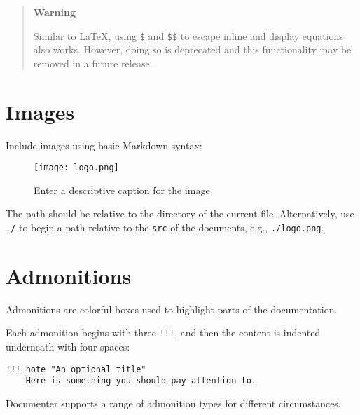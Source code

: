 \begin{quote}
\textbf{Warning}

Similar to LaTeX, using \texttt{\$} and \texttt{\$\$} to escape inline and display equations also works. However, doing so is deprecated and this functionality may be removed in a future release.

\end{quote}


\section{Images}



\label{5224713065671704740}{}


Include images using basic Markdown syntax:



\begin{figure}
\centering
\texttt{[image: logo.png]}
\caption{Enter a descriptive caption for the image}
\end{figure}




The path should be relative to the directory of the current file. Alternatively, use \texttt{./} to begin a path relative to the \texttt{src} of the documents, e.g., \texttt{./logo.png}.



\section{Admonitions}



\label{1916796393499649241}{}


Admonitions are colorful boxes used to highlight parts of the documentation.



Each admonition begins with three \texttt{!!!}, and then the content is indented underneath with four spaces:




\begin{lstlisting}
!!! note "An optional title"
    Here is something you should pay attention to.
\end{lstlisting}



Documenter supports a range of admonition types for different circumstances.



